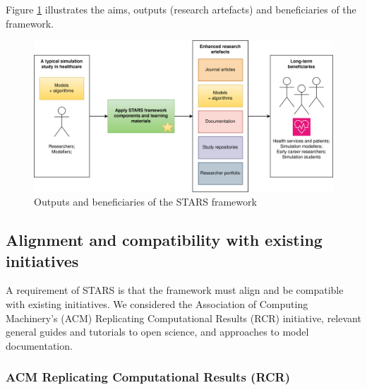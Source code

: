 \documentclass[]{interact}
\theoremstyle{plain}%
\theoremstyle{definition}
\theoremstyle{remark}
\begin{document}
Figure \ref{fig:stars_aims} illustrates the aims, outputs (research artefacts) and beneficiaries of the framework.

\begin{figure}
\centering
    \includegraphics[scale=0.70]{images/stars_aims_paper.png}
    \caption{Outputs and beneficiaries of the STARS framework}
    \label{fig:stars_aims}
\end{figure}




\subsection{Alignment and compatibility with existing initiatives}

A requirement of STARS is that the framework must align and be compatible with existing initiatives. We considered the Association of Computing Machinery's (ACM) Replicating Computational Results (RCR) initiative, relevant general guides and tutorials to open science, and approaches to model documentation.


\subsubsection{ACM Replicating Computational Results (RCR)}
\end{document}
